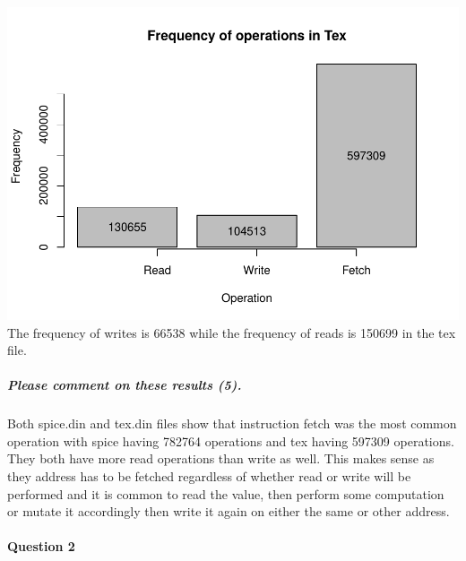 \documentclass[
]{article}
\begin{document}
\includegraphics{muhammad-umar-hw1-cs402_files/figure-latex/unnamed-chunk-5-1.pdf}
The frequency of writes is 66538 while the frequency of reads is 150699
in the tex file.

\hypertarget{please-comment-on-these-results-5.}{%
\subparagraph{Please comment on these results
(5).}\label{please-comment-on-these-results-5.}}

Both spice.din and tex.din files show that instruction fetch was the
most common operation with spice having 782764 operations and tex having
597309 operations. They both have more read operations than write as
well. This makes sense as they address has to be fetched regardless of
whether read or write will be performed and it is common to read the
value, then perform some computation or mutate it accordingly then write
it again on either the same or other address.

\hypertarget{question-2}{%
\paragraph{Question 2}\label{question-2}}
\end{document}
